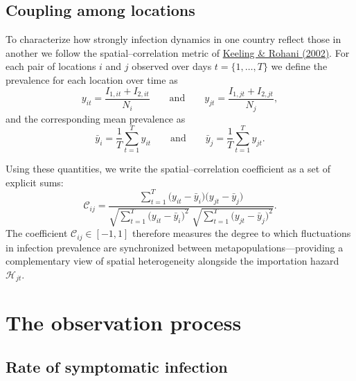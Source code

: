 \documentclass[
]{book}
\begin{document}
\subsection{Coupling among locations}\label{coupling-among-locations}

To characterize how strongly infection dynamics in one country reflect those in another we follow the spatial--correlation metric of \href{https://onlinelibrary.wiley.com/doi/abs/10.1046/j.1461-0248.2002.00268.x}{Keeling \& Rohani (2002)}. For each pair of locations \(i\) and \(j\) observed over days \(t = \{1,\dots ,T\}\) we define the prevalence for each location over time as
\begin{equation}
y_{it} = \frac{I_{1,it}+I_{2,it}}{N_i}
\qquad \text{and} \qquad
y_{jt} = \frac{I_{1,jt}+I_{2,jt}}{N_j},
\label{eq:location-prevalence}
\end{equation}
and the corresponding mean prevalence as\\
\begin{equation}
\bar y_i = \frac{1}{T}\sum_{t=1}^{T} y_{it}
\qquad \text{and} \qquad
\bar y_j = \frac{1}{T}\sum_{t=1}^{T} y_{jt}.
\label{eq:location-mean-prevalence}
\end{equation}

Using these quantities, we write the spatial--correlation coefficient as a set of explicit sums:
\begin{equation}
\mathcal{C}_{ij} = 
\frac{ \sum_{t=1}^{T}\bigl(y_{it}-\bar y_i\bigr)\bigl(y_{jt}-\bar y_j\bigr) }
     { \sqrt{\sum_{t=1}^{T}\bigl(y_{it}-\bar y_i\bigr)^{2}}
       \;\sqrt{\sum_{t=1}^{T}\bigl(y_{jt}-\bar y_j\bigr)^{2}} }.
\label{eq:correlation}
\end{equation}
The coefficient \(\mathcal{C}_{ij}\in[-1,1]\) therefore measures the degree to which fluctuations in infection prevalence are synchronized between metapopulations---providing a complementary view of spatial heterogeneity alongside the importation hazard \(\mathcal{H}_{jt}\).

\section{The observation process}\label{the-observation-process}

\subsection{Rate of symptomatic infection}\label{rate-of-symptomatic-infection}
\end{document}
